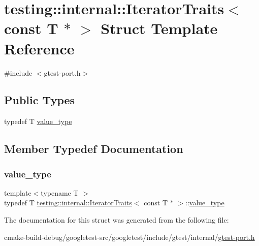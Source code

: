 \hypertarget{structtesting_1_1internal_1_1IteratorTraits_3_01const_01T_01_5_01_4}{}\section{testing\+::internal\+::Iterator\+Traits$<$ const T $\ast$ $>$ Struct Template Reference}
\label{structtesting_1_1internal_1_1IteratorTraits_3_01const_01T_01_5_01_4}


{\ttfamily \#include $<$gtest-\/port.\+h$>$}

\subsection*{Public Types}
\begin{DoxyCompactItemize}
\item 
typedef T \mbox{\hyperlink{structtesting_1_1internal_1_1IteratorTraits_3_01const_01T_01_5_01_4_ae7c8867223e106f374b56a7dc4a85547}{value\+\_\+type}}
\end{DoxyCompactItemize}


\subsection{Member Typedef Documentation}
\mbox{\label{structtesting_1_1internal_1_1IteratorTraits_3_01const_01T_01_5_01_4_ae7c8867223e106f374b56a7dc4a85547}} 
\subsubsection{\texorpdfstring{value\_type}{value\_type}}
{\footnotesize\ttfamily template$<$typename T $>$ \\
typedef T \mbox{\hyperlink{structtesting_1_1internal_1_1IteratorTraits}{testing\+::internal\+::\+Iterator\+Traits}}$<$ const T $\ast$ $>$\+::\mbox{\hyperlink{structtesting_1_1internal_1_1IteratorTraits_3_01const_01T_01_5_01_4_ae7c8867223e106f374b56a7dc4a85547}{value\+\_\+type}}}



The documentation for this struct was generated from the following file\+:\begin{DoxyCompactItemize}
\item 
cmake-\/build-\/debug/googletest-\/src/googletest/include/gtest/internal/\mbox{\hyperlink{gtest-port_8h}{gtest-\/port.\+h}}\end{DoxyCompactItemize}
